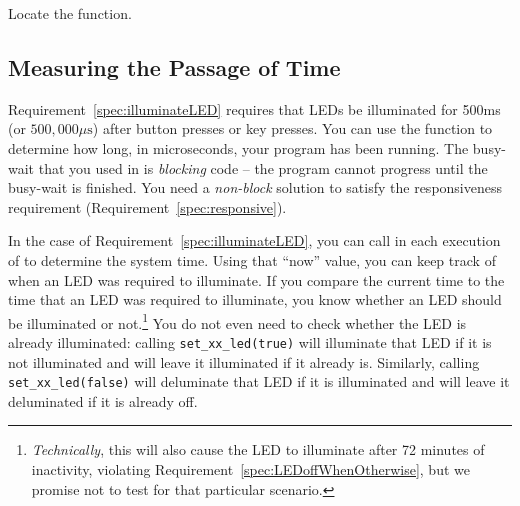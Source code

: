 Locate the  function.
\begin{description}
\end{description}


\subsection{Measuring the Passage of Time}

Requirement~\ref{spec:illuminateLED} requires that LEDs be illuminated for 500ms (or $500,000\mu\mathrm{s}$) after button presses or key presses.
You can use the  function to determine how long, in microseconds, your program has been running.
The busy-wait that you used in  is \textit{blocking} code -- the program cannot progress until the busy-wait is finished.
You need a \textit{non-block} solution to satisfy the responsiveness requirement (Requirement~\ref{spec:responsive}).

In the case of Requirement~\ref{spec:illuminateLED}, you can call  in each execution of  to determine the system time.
Using that ``now'' value, you can keep track of when an LED was required to illuminate.
If you compare the current time to the time that an LED was required to illuminate, you know whether an LED should be illuminated or not.\footnote{
    \textit{Technically}, this will also cause the LED to illuminate after 72 minutes of inactivity, violating Requirement~\ref{spec:LEDoffWhenOtherwise}, but we promise not to test for that particular scenario.
}
You do not even need to check whether the LED is already illuminated:
calling \lstinline{set_xx_led(true)} will illuminate that LED if it is not illuminated and will leave it illuminated if it already is.
Similarly, calling \lstinline{set_xx_led(false)} will deluminate that LED if it is illuminated and will leave it deluminated if it is already off.

